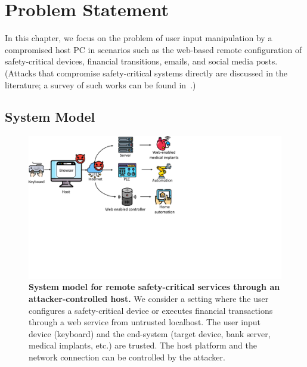 \section{Problem Statement}
\label{sec:problemStatement_IK}

In this chapter, we focus on the problem of user input manipulation by a compromised host PC in scenarios such as the web-based remote configuration of safety-critical devices, financial transitions, emails, and social media posts. (Attacks that compromise safety-critical systems directly are discussed in the literature; a survey of such works can be found in~\cite{fachkha2017internet}.)



\subsection{System Model}

\begin{figure}[t]
    \centering
    \includegraphics[trim={0 8cm 14cm 0},clip,width=0.9\linewidth]{chapters/IntegriKey/images/Motivation.pdf}
    \caption[System model for remote safety-critical services through an attacker-controlled host]{\textbf{System model for remote safety-critical services through an attacker-controlled host.} We consider a setting where the user configures a safety-critical device or executes financial transactions through a web service from untrusted localhost. The user input device (keyboard) and the end-system (target device, bank server, medical implants, etc.) are trusted. The host platform and the network connection can be controlled by the attacker.} 

    \label{fig:systemModel}
\end{figure}

